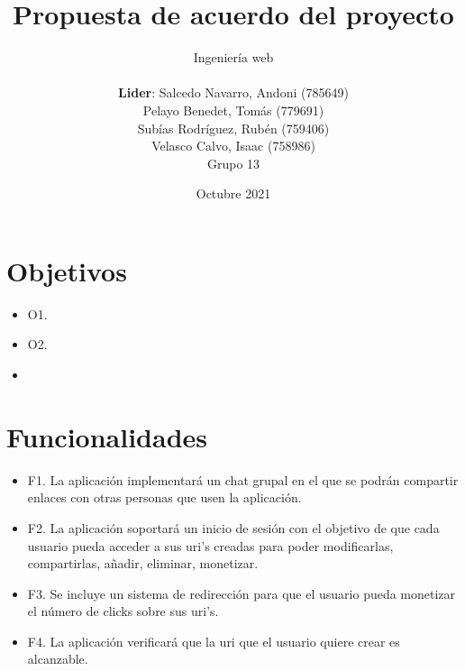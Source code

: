 \documentclass{article}
\title{Propuesta de acuerdo del proyecto}
\author{Ingeniería web\\\\\textbf{Lider}: Salcedo Navarro, Andoni (785649)\\Pelayo Benedet, Tomás (779691)\\Subías Rodríguez, Rubén (759406)\\Velasco Calvo, Isaac (758986)\\Grupo 13}
\date{Octubre 2021}
\begin{document}
 
\maketitle
 
\pagebreak
 
\section*{Objetivos}

\begin{itemize}
    \item O1.
    \item O2.
    \item 
\end{itemize}

\section*{Funcionalidades}

\begin{itemize}
    \item F1. La aplicación implementará un chat grupal en el que se podrán compartir enlaces con otras personas que usen la aplicación. 
    \item F2. La aplicación soportará un inicio de sesión con el objetivo de que cada usuario pueda acceder a sus uri's creadas para poder modificarlas, compartirlas, añadir, eliminar, monetizar.
    \item F3. Se incluye un sistema de redirección para que el usuario pueda monetizar el número de clicks sobre sus uri's.
    \item F4. La aplicación verificará que la uri que el usuario quiere crear es alcanzable.
\end{itemize}
\end{document}
